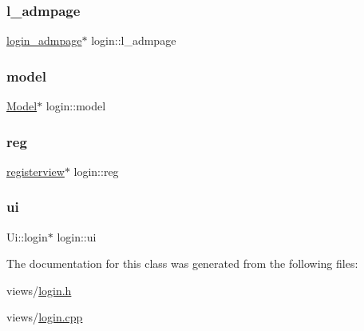 \subsubsection{\texorpdfstring{l\+\_\+admpage}{l\_admpage}}
{\footnotesize\ttfamily \hyperlink{classlogin__admpage}{login\+\_\+admpage}$\ast$ login\+::l\+\_\+admpage\hspace{0.3cm}{\ttfamily [private]}}

\mbox{\label{classlogin_a2e047dc21e76732165598efabd633aa4}} 
\subsubsection{\texorpdfstring{model}{model}}
{\footnotesize\ttfamily \hyperlink{classModel}{Model}$\ast$ login\+::model\hspace{0.3cm}{\ttfamily [private]}}

\mbox{\label{classlogin_ae69e30e8855dbf4a08d3080edc6fcde4}} 
\subsubsection{\texorpdfstring{reg}{reg}}
{\footnotesize\ttfamily \hyperlink{classregisterview}{registerview}$\ast$ login\+::reg\hspace{0.3cm}{\ttfamily [private]}}

\mbox{\label{classlogin_ab08986017bf8d41e5cbab46dd0492d38}} 
\subsubsection{\texorpdfstring{ui}{ui}}
{\footnotesize\ttfamily Ui\+::login$\ast$ login\+::ui\hspace{0.3cm}{\ttfamily [private]}}



The documentation for this class was generated from the following files\+:\begin{DoxyCompactItemize}
\item 
views/\hyperlink{login_8h}{login.\+h}\item 
views/\hyperlink{login_8cpp}{login.\+cpp}\end{DoxyCompactItemize}
